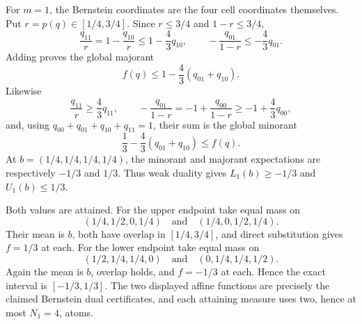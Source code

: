 For \(m=1\), the Bernstein coordinates are the four cell coordinates themselves.  Put \(r=p(q)\in[1/4,3/4]\).  Since \(r\leq3/4\) and \(1-r\leq3/4\),
\[
 \frac{q_{11}}r=1-\frac{q_{10}}r\leq1-\frac43q_{10},
 \qquad
 -\frac{q_{01}}{1-r}\leq-\frac43q_{01}.
\]
Adding proves the global majorant
\[
 f(q)\leq 1-\frac43(q_{01}+q_{10}).
\]
Likewise
\[
 \frac{q_{11}}r\geq\frac43q_{11},
 \qquad
 -\frac{q_{01}}{1-r}=-1+\frac{q_{00}}{1-r}\geq-1+\frac43q_{00},
\]
and, using \(q_{00}+q_{01}+q_{10}+q_{11}=1\), their sum is the global minorant
\[
 \frac13-\frac43(q_{01}+q_{10})\leq f(q).
\]
At \(b=(1/4,1/4,1/4,1/4)\), the minorant and majorant expectations are respectively \(-1/3\) and \(1/3\).  Thus weak duality gives \(L_1(b)\geq-1/3\) and \(U_1(b)\leq1/3\).

Both values are attained.  For the upper endpoint take equal mass on
\[
 (1/4,1/2,0,1/4)
 \quad\text{and}\quad
 (1/4,0,1/2,1/4).
\]
Their mean is \(b\), both have overlap in \([1/4,3/4]\), and direct substitution gives \(f=1/3\) at each.  For the lower endpoint take equal mass on
\[
 (1/2,1/4,1/4,0)
 \quad\text{and}\quad
 (0,1/4,1/4,1/2).
\]
Again the mean is \(b\), overlap holds, and \(f=-1/3\) at each.  Hence the exact interval is \([-1/3,1/3]\).  The two displayed affine functions are precisely the claimed Bernstein dual certificates, and each attaining measure uses two, hence at most \(N_1=4\), atoms.